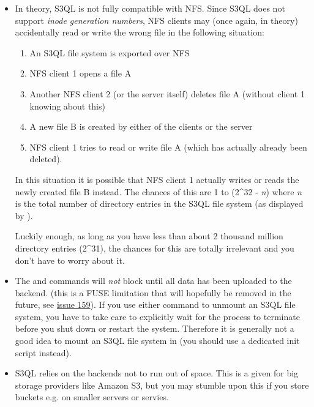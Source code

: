 \documentclass[letterpaper,10pt,english]{sphinxmanual}
\begin{document}
\begin{itemize}
\item {} 
In theory, S3QL is not fully compatible with NFS. Since S3QL does
not support \emph{inode generation numbers}, NFS clients may (once again,
in theory) accidentally read or write the wrong file in the
following situation:
\begin{enumerate}
\item {} 
An S3QL file system is exported over NFS

\item {} 
NFS client 1 opens a file A

\item {} 
Another NFS client 2 (or the server itself) deletes file A (without
client 1 knowing about this)

\item {} 
A new file B is created by either of the clients or the server

\item {} 
NFS client 1 tries to read or write file A (which has actually already been deleted).

\end{enumerate}

In this situation it is possible that NFS client 1 actually writes
or reads the newly created file B instead. The chances of this are 1
to (2\textasciicircum{}32 - \emph{n}) where \emph{n} is the total number of directory entries
in the S3QL file system (as displayed by ).

Luckily enough, as long as you have less than about 2 thousand
million directory entries (2\textasciicircum{}31), the chances for this are totally
irrelevant and you don't have to worry about it.

\item {} 
The  and  commands will \emph{not} block until all
data has been uploaded to the backend. (this is a FUSE limitation
that will hopefully be removed in the future, see \href{http://code.google.com/p/s3ql/issues/detail?id=159}{issue 159}). If you use
either command to unmount an S3QL file system, you have to take care
to explicitly wait for the  process to terminate before
you shut down or restart the system. Therefore it is generally not a
good idea to mount an S3QL file system in  (you should
use a dedicated init script instead).

\item {} 
S3QL relies on the backends not to run out of space. This is a given
for big storage providers like Amazon S3, but you may stumble upon
this if you store buckets e.g. on smaller servers or servies.


\end{itemize}
\end{document}
